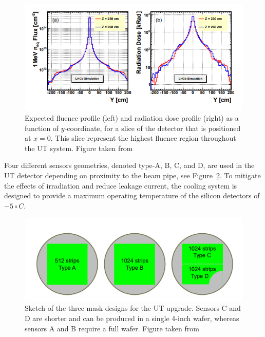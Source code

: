  \begin{figure}[!h]
\centering
\includegraphics{figures/UT_dose.PNG}
\caption{Expected fluence profile (left) and radiation dose profile (right) as a function of $y$-coordinate, for a slice of the detector that is positioned at $x=0$. This slice represent the highest fluence region throughout the UT system. Figure taken from~\cite{upgrade_tracker_tdr}
\label{fig:UT_dose}}
\end{figure}

 
 Four different sensors geometries, denoted type-A, B, C, and D, are used in the UT detector depending on proximity to the beam pipe, see Figure~\ref{fig:UT_sensors}. To mitigate the effects of irradiation and reduce leakage current, the cooling system is designed to provide a maximum operating temperature of the silicon detectors of $-5\circ C$. 
 
 
 
 \begin{figure}[!h]
\centering
\includegraphics{figures/UT_sensors.PNG}
\caption{Sketch of the three mask designs for the UT upgrade. Sensors C and D are shorter and
can be produced in a single 4-inch wafer, whereas sensors A and B require a full wafer.  Figure taken from~\cite{upgrade_tracker_tdr}
\label{fig:UT_sensors}}
\end{figure}
 
